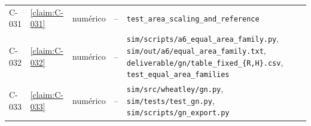 \begin{longtable}{@{}l>{\raggedright}p{}>{\raggedright}p{}>{\raggedright}p{}>{\raggedright\arraybackslash}p{}@{}}
C-031 & \cref{claim:C-031} & numérico & -- & \texttt{test\_\allowbreak{}area\_\allowbreak{}scaling\_\allowbreak{}and\_\allowbreak{}reference}\\
C-032 & \cref{claim:C-032} & numérico & -- & \texttt{sim/\allowbreak{}scripts/\allowbreak{}a6\_\allowbreak{}equal\_\allowbreak{}area\_\allowbreak{}family.\allowbreak{}py}, \texttt{sim/\allowbreak{}out/\allowbreak{}a6/\allowbreak{}equal\_\allowbreak{}area\_\allowbreak{}family.\allowbreak{}txt}, \texttt{deliverable/\allowbreak{}gn/\allowbreak{}table\_\allowbreak{}fixed\_\allowbreak{}\{R,H\}.\allowbreak{}csv}, \texttt{test\_\allowbreak{}equal\_\allowbreak{}area\_\allowbreak{}families}\\
C-033 & \cref{claim:C-033} & numérico & -- & \texttt{sim/\allowbreak{}src/\allowbreak{}wheatley/\allowbreak{}gn.\allowbreak{}py}, \texttt{sim/\allowbreak{}tests/\allowbreak{}test\_\allowbreak{}gn.\allowbreak{}py}, \texttt{sim/\allowbreak{}scripts/\allowbreak{}gn\_\allowbreak{}export.\allowbreak{}py}\\
\end{longtable}
